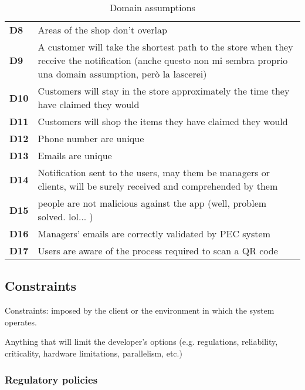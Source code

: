 \begin{table}[h!]
\begin{tabular}{@{}P{0.1\textwidth}P{0.80\textwidth}@{}}
        \textbf{D8}       & Areas of the shop don’t overlap\\
        \textbf{D9}       & A customer will take the shortest path to the store when they receive the notification (anche questo non mi sembra proprio una domain assumption, però la lascerei)\\
        \textbf{D10}       & Customers will stay in the store approximately the time they have claimed they would\\
        \textbf{D11}       & Customers will shop the items they have claimed they would\\
        \textbf{D12}       & Phone number are unique\\
        \textbf{D13}       & Emails are unique\\
        \textbf{D14}       & Notification sent to the users, may them be managers or clients, will be surely received and comprehended by them\\
        \textbf{D15}       &  people are not malicious against the app (well, problem solved. lol... )\\
        \textbf{D16}       & Managers' emails are correctly validated by PEC system\\
        \textbf{D17}       & Users are aware of the process required to scan a QR code\\







        \bottomrule
    \end{tabular}
\caption{Domain assumptions}
\label{table:domainassumptions}
\end{table}

\subsection{Constraints}
\label{subsect:contraints}

Constraints: imposed by the client or the environment in which the system operates. 

Anything that will limit the developer’s options (e.g. regulations, reliability, criticality, hardware limitations, parallelism, etc.)

\subsubsection{Regulatory policies}
\label{subsubsect:regulatorypolicies}

